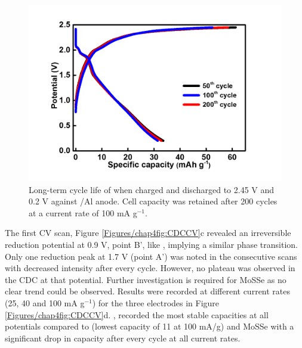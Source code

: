 \begin{figure}[htb!]
\centering
\includegraphics[width=\textwidth]{Figures/chap4fig/mose2}
\caption{Long-term cycle life of  when charged and discharged to 2.45 V and 0.2 V against /Al anode. Cell capacity was retained after 200 cycles at a current rate of 100 mA g$^{-1}$.}
\label{Figures/chap4fig:mose2}
\end{figure}

The first CV scan, Figure \ref{Figures/chap4fig:CDCCV}c revealed an irreversible reduction potential at 0.9 V, point B', like , implying a similar phase transition. Only one reduction peak at 1.7 V (point A') was noted in the consecutive scans with decreased intensity after every cycle. However, no plateau was observed in the CDC at that potential. Further investigation is required for MoSSe as no clear trend could be observed. Results were recorded at different current rates (25, 40 and 100 mA g$^{-1}$) for the three electrodes in Figure \ref{Figures/chap4fig:CDCCV}d. , recorded the most stable capacities at all potentials compared to  (lowest capacity of 11 at 100 mA/g) and MoSSe with a significant drop in capacity after every cycle at all current rates. 

